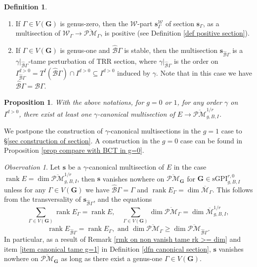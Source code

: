 \documentclass[11pt]{amsart}
\newtheorem{prop}[dummy]{Proposition}
\theoremstyle{definition}
\newtheorem{dfn}[dummy]{Definition}
\theoremstyle{remark}
\newtheorem{obs}[dummy]{Observation}
\newcommand{\oPMb}{{\overline{\mathcal{PM}}}}
\newcommand{\<}{\left<}
\renewcommand{\>}{\right>}
\numberwithin{equation}{section}
\DeclareMathOperator{\rk}{rank}
\def\Mbar{{\overline{\mathcal M}}}
\def\sGPI{\text{sGPI}}
\begin{document}
\begin{dfn}
\begin{enumerate}
         \item \label{item canonical positive} If $\Gamma\in V(\bm G)$ is genus-zero, then the $\mathcal W$-part $\bm{s}^{\mathcal W}_\Gamma$ of section $\bm{s}_\Gamma$, as a multisection of $\mathcal W_\Gamma \to \oPMb_\Gamma$, is positive (see Definition \ref{def positive section}).
         
         \item \label{item canonical tame g=1} If $\Gamma\in V(\bm G)$ is genus-one and $\hat{\mathcal B}\Gamma$ is stable, then the multisection $\bm{s}_{\hat{\mathcal B} \Gamma}$  is a $\gamma\vert_{\hat{\mathcal B} \Gamma}$-tame perturbation of TRR section, where  $\gamma\vert_{\hat{\mathcal B} \Gamma}$ is the order on $I^{d>0}_{\hat{\mathcal B} \Gamma}=T^I(\hat{\mathcal B} \Gamma)\cap I^{d>0}\subseteq I^{d>0}$ induced by $\gamma$.
         Note that in this case we have ${\hat{\mathcal B} \Gamma}={{\mathcal B} \Gamma}$.
     \end{enumerate}
\end{dfn}



\begin{prop}\label{prop exist canonical section}
    With the above notations, for $g=0$ or $1$, for any order $\gamma$ on $I^{d>0}$, there exist at least one $\gamma$-canonical multisection of $E\to \oPMb_{g,B,I}^{1/r}$.
\end{prop}
We postpone the construction of $\gamma$-canonical multisections in the $g=1$ case to \S \ref{sec construction of section}. A construction in the $g=0$ case can be found in Proposition \ref{prop compare with BCT in g=0}.

\begin{obs} \label{obs non vanish when exist g=1 component}
    Let $\bm{s}$ be a $\gamma$-canonical multisection of $E$ in the case $\rk E=\dim\oPMb_{g,B,I}^{1/r}$, then $\bm{s}$ vanishes nowhere on $\oPMb_{\bm{G}}$ for $\bm{G}\in \sGPI^{r,0}_{g,B,I}$ unless for any $\Gamma \in V(\bm{G})$ we have 
    $\hat{\mathcal B}\Gamma=\Gamma$ and $\rk E_{\Gamma}=\dim\Mbar_{\Gamma}$. This follows from the transversality of $\bm{s}_{\hat{\mathcal B}\Gamma}$, and the equations 
    $$\sum_{\Gamma \in V(\bm{G})} \rk E_\Gamma = \rk E, \quad \sum_{\Gamma \in V(\bm{G})} \dim \oPMb_\Gamma=\dim \Mbar_{g,B,I}^{1/r},$$
    $$ \rk E_{\hat{\mathcal B}\Gamma}=\rk E_\Gamma, \text{ and } \dim \oPMb_\Gamma \ge \dim \oPMb_{\hat{\mathcal B}\Gamma}.$$
    In particular,  as a result of Remark \ref{rmk on non vanish tame rk >= dim} and item \ref{item canonical tame g=1} in Definition \ref{dfn canonical section}, $\bm{s}$ vanishes nowhere on $\oPMb_{\bm{G}}$ as long as there exist a genus-one $\Gamma \in V(\bm{G})$. 
\end{obs}
\end{document}
